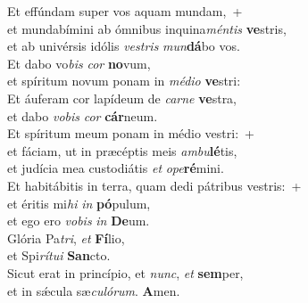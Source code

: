 \evenverse Et effúndam super vos aquam mundam,~+\\\evenverse  et mundabímini ab ómnibus inquina\textit{mén}\textit{tis} \textbf{ve}stris,~\*\\
\evenverse et ab univérsis idólis \textit{ve}\textit{stris} \textit{mun}\textbf{dá}bo vos.\\
\oddverse Et dabo vo\textit{bis} \textit{cor} \textbf{no}vum,~\*\\
\oddverse et spíritum novum ponam in \textit{mé}\textit{di}\textit{o} \textbf{ve}stri:\\
\evenverse Et áuferam cor lapídeum de \textit{car}\textit{ne} \textbf{ve}stra,~\*\\
\evenverse et dabo \textit{vo}\textit{bis} \textit{cor} \textbf{cár}neum.\\
\oddverse Et spíritum meum ponam in médio vestri:~+\\
\oddverse  et fáciam, ut in præcéptis meis \textit{am}\textit{bu}\textbf{lé}tis,~\*\\
\oddverse et judícia mea custodiátis \textit{et} \textit{o}\textit{pe}\textbf{ré}mini.\\
\evenverse Et habitábitis in terra, quam dedi pátribus vestris:~+\\
\evenverse  et éritis mi\textit{hi} \textit{in} \textbf{pó}pulum,~\*\\
\evenverse et ego ero \textit{vo}\textit{bis} \textit{in} \textbf{De}um.\\
\oddverse Glória Pa\textit{tri}, \textit{et} \textbf{Fí}lio,~\*\\
\oddverse et Spi\textit{rí}\textit{tu}\textit{i} \textbf{San}cto.\\
\evenverse Sicut erat in princípio, et \textit{nunc}, \textit{et} \textbf{sem}per,~\*\\
\evenverse et in sǽcula sæ\textit{cu}\textit{ló}\textit{rum}. \textbf{A}men.\\
